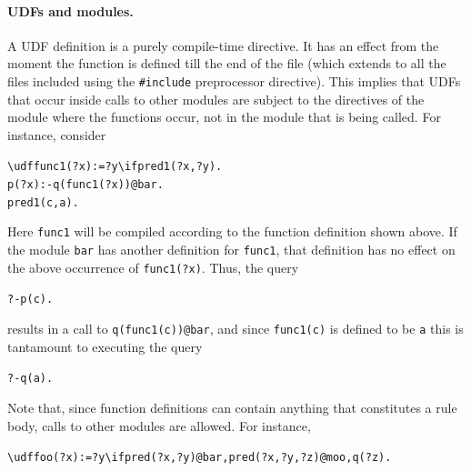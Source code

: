 \documentclass[11pt]{article}
\newcommand{\ERGO}{\mbox{\smaller{\ensuremath{\cal{E}}\smaller{{\sc{RGO}}}}}\xspace}
\newcommand{\FLSYSTEM}{\ERGO}
\newcommand{\bs}{\textbackslash}
\begin{document}
\paragraph{UDFs and modules.}
A UDF definition is a purely compile-time directive. It has an effect from
the moment the function is defined till the end of the file (which extends to
all the files included using the \texttt{\#include} preprocessor
directive). This implies that UDFs that occur inside calls to other \FLSYSTEM
modules are subject to the directives of the module where the functions
occur, not in the module that is being called. For instance, consider
\begin{alltt}
    \bs{}udf func1(?x) := ?y \bs{}if pred1(?x,?y).
    p(?x) :- q(func1(?x))@bar.
    pred1(c,a).
\end{alltt}
Here \texttt{func1} will be compiled according to the function definition
shown above. If the module \texttt{bar} has another definition for
\texttt{func1}, that definition has no effect on the above occurrence of
\texttt{func1(?x)}.   Thus, the query
\begin{alltt}
?- p(c).
\end{alltt}
results in a call to \texttt{q(func1(c))@bar}, and since \texttt{func1(c)} is
defined to be \texttt{a} this is tantamount to executing the query  
\begin{alltt}
?- q(a).
\end{alltt}
Note that, since function definitions can contain anything that constitutes
a rule body, calls to other modules are allowed. For instance, 
\begin{alltt}
    \bs{}udf foo(?x):=?y \bs{}if pred(?x,?y)@bar, pred(?x,?y,?z)@moo, q(?z).
\end{alltt}
\end{document}
